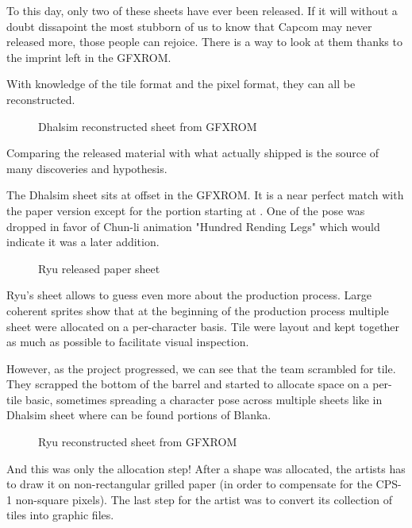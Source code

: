 To this day, only two of these sheets have ever been released\cite{fdasd}\cite{fs}. If it will without a doubt dissapoint the most stubborn of us to know that Capcom may never released more, those people can rejoice. There is a way to look at them thanks to the imprint left in the GFXROM. 

With knowledge of the tile format and the pixel format, they can all be reconstructed.




 \begin{figure}[H]
\caption*{Dhalsim reconstructed sheet from GFXROM}
\end{figure}

Comparing the released material with what actually shipped is the source of many discoveries and hypothesis. 


The Dhalsim sheet sits at offset  in the GFXROM. It is a near perfect match with the paper version except for the portion starting at . One of the pose was dropped in favor of Chun-li animation "Hundred Rending Legs" which would indicate it was a later addition. 

 \begin{figure}[H]
\caption*{Ryu released paper sheet}
\end{figure}

Ryu's sheet  allows to guess even more about the production process. Large coherent sprites show that at the beginning of the production process multiple sheet were allocated on a per-character basis. Tile were layout and kept together as much as possible to facilitate visual inspection.

However, as the project progressed, we can see that the team scrambled for tile. They scrapped the bottom of the barrel and started to allocate space on a per-tile basic, sometimes spreading a character pose across multiple sheets like in Dhalsim sheet where can be found portions of Blanka.

 \begin{figure}[H]
\caption*{Ryu reconstructed sheet from GFXROM}
\end{figure}


And this was only the allocation step! After a shape was allocated, the artists has to draw it on non-rectangular grilled paper (in order to compensate for the CPS-1 non-square pixels). The last step for the artist was to convert its collection of tiles into graphic files. 

